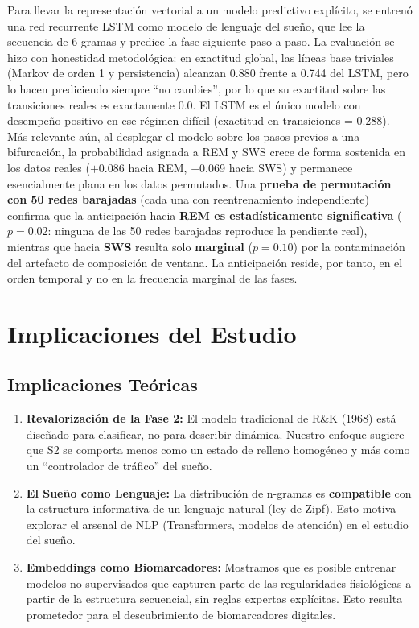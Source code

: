 Para llevar la representación vectorial a un modelo predictivo explícito, se entrenó una red recurrente LSTM como modelo de lenguaje del sueño, que lee la secuencia de 6-gramas y predice la fase siguiente paso a paso. La evaluación se hizo con honestidad metodológica: en exactitud global, las líneas base triviales (Markov de orden 1 y persistencia) alcanzan 0.880 frente a 0.744 del LSTM, pero lo hacen prediciendo siempre ``no cambies'', por lo que su exactitud sobre las transiciones reales es exactamente 0.0. El LSTM es el único modelo con desempeño positivo en ese régimen difícil (exactitud en transiciones = 0.288). Más relevante aún, al desplegar el modelo sobre los pasos previos a una bifurcación, la probabilidad asignada a REM y SWS crece de forma sostenida en los datos reales ($+$0.086 hacia REM, $+$0.069 hacia SWS) y permanece esencialmente plana en los datos permutados. Una \textbf{prueba de permutación con 50 redes barajadas} (cada una con reentrenamiento independiente) confirma que la anticipación hacia \textbf{REM es estadísticamente significativa} ($p=0.02$: ninguna de las 50 redes barajadas reproduce la pendiente real), mientras que hacia \textbf{SWS} resulta solo \textbf{marginal} ($p=0.10$) por la contaminación del artefacto de composición de ventana. La anticipación reside, por tanto, en el orden temporal y no en la frecuencia marginal de las fases.

\section{Implicaciones del Estudio}

\subsection{Implicaciones Teóricas}

\begin{enumerate}
    \item \textbf{Revalorización de la Fase 2:} El modelo tradicional de R\&K (1968) está diseñado para clasificar, no para describir dinámica. Nuestro enfoque sugiere que S2 se comporta menos como un estado de relleno homogéneo y más como un ``controlador de tráfico'' del sueño.

    \item \textbf{El Sueño como Lenguaje:} La distribución de n-gramas es \textbf{compatible} con la estructura informativa de un lenguaje natural (ley de Zipf). Esto motiva explorar el arsenal de NLP (Transformers, modelos de atención) en el estudio del sueño.

    \item \textbf{Embeddings como Biomarcadores:} Mostramos que es posible entrenar modelos no supervisados que capturen parte de las regularidades fisiológicas a partir de la estructura secuencial, sin reglas expertas explícitas. Esto resulta prometedor para el descubrimiento de biomarcadores digitales.
\end{enumerate}

